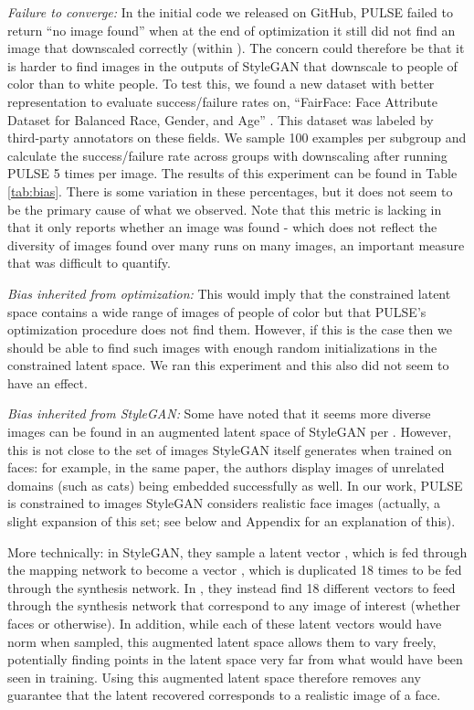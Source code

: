 \documentclass[10pt,twocolumn,letterpaper]{article}
\begin{document}
\noindent\textit{Failure to converge:} In the initial code we released on GitHub, PULSE failed to return ``no image found'' when at the end of optimization it still did not find an image that downscaled correctly (within ). The concern could therefore be that it is harder to find images in the outputs of StyleGAN that downscale to people of color than to white people. To test this, we found a new dataset with better representation to evaluate success/failure rates on, ``FairFace: Face Attribute Dataset for Balanced Race, Gender, and Age'' \cite{fairface}. This dataset was labeled by third-party annotators on these fields. We sample 100 examples per subgroup and calculate the success/failure rate across groups with  downscaling after running PULSE 5 times per image. The results of this experiment can be found in Table \ref{tab:bias}. There is some variation in these percentages, but it does not seem to be the primary cause of what we observed. Note that this metric is lacking in that it only reports whether an image was found - which does not reflect the diversity of images found over many runs on many images, an important measure that was difficult to quantify.
\newline

\noindent\textit{Bias inherited from optimization:} This would imply that the constrained latent space contains a wide range of images of people of color but that PULSE's optimization procedure does not find them. However, if this is the case then we should be able to find such images with enough random initializations in the constrained latent space. We ran this experiment and this also did not seem to have an effect. \newline

\noindent\textit{Bias inherited from StyleGAN:} Some have noted that it seems more diverse images can be found in an augmented latent space of StyleGAN per \cite{styleganembedding}. However, this is not close to the set of images StyleGAN itself generates when trained on faces: for example, in the same paper, the authors display images of unrelated domains (such as cats) being embedded successfully as well. In our work, PULSE is constrained to images StyleGAN considers realistic face images (actually, a slight expansion of this set; see below and Appendix for an explanation of this).
    
More technically: in StyleGAN, they sample a latent vector , which is fed through the mapping network to become a vector , which is duplicated 18 times to be fed through the synthesis network. In \cite{styleganembedding}, they instead find 18 different vectors to feed through the synthesis network that correspond to any image of interest (whether faces or otherwise). In addition, while each of these latent vectors would have norm  when sampled, this augmented latent space allows them to vary freely, potentially finding points in the latent space very far from what would have been seen in training. Using this augmented latent space therefore removes any guarantee that the latent recovered corresponds to a realistic image of a face. 
    
\end{document}
